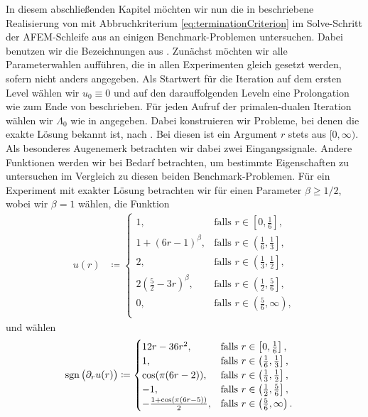 In diesem abschließenden Kapitel möchten wir nun die in
 beschriebene Realisierung von
 mit Abbruchkriterium
\eqref{eq:terminationCriterion} im Solve-Schritt der AFEM-Schleife aus
 an einigen Benchmark-Problemen untersuchen.
Dabei benutzen wir die Bezeichnungen aus .
Zunächst möchten wir alle Parameterwahlen aufführen, die in allen 
Experimenten gleich gesetzt werden, sofern nicht anders angegeben.
Als Startwert für die Iteration auf dem ersten Level wählen wir
$u_0\equiv 0$ und auf den darauffolgenden Leveln eine Prolongation wie zum
Ende von  beschrieben.
Für jeden Aufruf der primalen-dualen Iteration wählen wir $\Lambda_0$ wie in
 angegeben.
Dabei konstruieren wir Probleme, bei denen die exakte Lösung bekannt ist,
nach . 
Bei diesen ist ein Argument $r$ stets aus $[0,\infty)$.
Als besonderes Augenemerk betrachten wir dabei zwei Eingangssignale.
Andere Funktionen werden wir bei Bedarf betrachten, um bestimmte Eigenschaften
zu untersuchen im Vergleich zu diesen beiden Benchmark-Problemen.
Für ein Experiment mit exakter Lösung betrachten wir für einen Parameter
$\beta\geq 1/2$, wobei wir $\beta =1$ wählen, die Funktion
\begin{align*}
  u(r)&\coloneqq
  \begin{cases}
    1, 
    & \text{falls } r\in \left[0,\frac{1}{6}\right],\\
    1+(6r-1)^\beta, 
    & \text{falls } r\in \left(\frac{1}{6}, \frac{1}{3}\right],\\
    2, 
    & \text{falls } r\in \left(\frac{1}{3}, \frac{1}{2}\right],\\
    2\left(\frac{5}{2}-3r\right)^\beta, 
    & \text{falls } r\in \left(\frac{1}{2}, \frac{5}{6}\right],\\
    0, 
    & \text{falls } r\in \left(\frac{5}{6}, \infty\right),\\
  \end{cases}
\end{align*}
und wählen
\begin{align*}
  \operatorname{sgn}\big(\partial_r u(r)\big) 
  &\coloneqq
  \begin{cases}
    12r-36r^2, 
    & \text{falls } r\in \left[0,\frac{1}{6}\right],\\
    1, 
    & \text{falls } r\in \left(\frac{1}{6}, \frac{1}{3}\right],\\
    \cos(\pi(6r-2)), 
    & \text{falls } r\in \left(\frac{1}{3}, \frac{1}{2}\right],\\
    -1, 
    & \text{falls } r\in \left(\frac{1}{2}, \frac{5}{6}\right],\\
    -\frac{1+\cos(\pi(6r-5))}{2}, 
    & \text{falls } r\in \left(\frac{5}{6}, \infty\right).
  \end{cases}
\end{align*}
